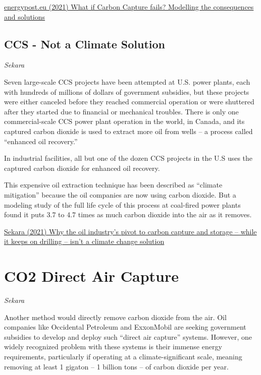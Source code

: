 \documentclass[
]{book}
\begin{document}
\href{https://energypost.eu/what-if-carbon-capture-fails-modelling-the-consequences-and-solutions/}{energypost.eu (2021) What if Carbon Capture fails? Modelling the consequences and solutions}

\hypertarget{ccs---not-a-climate-solution}{%
\section{CCS - Not a Climate Solution}\label{ccs---not-a-climate-solution}}

\emph{Sekara}

Seven large-scale CCS projects have been attempted at U.S. power plants, each with hundreds of millions of dollars of government subsidies, but these projects were either canceled before they reached commercial operation or were shuttered after they started due to financial or mechanical troubles. There is only one commercial-scale CCS power plant operation in the world, in Canada, and its captured carbon dioxide is used to extract more oil from wells -- a process called ``enhanced oil recovery.''

In industrial facilities, all but one of the dozen CCS projects in the U.S uses the captured carbon dioxide for enhanced oil recovery.

This expensive oil extraction technique has been described as ``climate mitigation'' because the oil companies are now using carbon dioxide. But a modeling study of the full life cycle of this process at coal-fired power plants found it puts 3.7 to 4.7 times as much carbon dioxide into the air as it removes.

\href{https://theconversation.com/why-the-oil-industrys-pivot-to-carbon-capture-and-storage-while-it-keeps-on-drilling-isnt-a-climate-change-solution-171791}{Sekara (2021) Why the oil industry's pivot to carbon capture and storage -- while it keeps on drilling -- isn't a climate change solution}

\hypertarget{co2-direct-air-capture}{%
\chapter{CO2 Direct Air Capture}\label{co2-direct-air-capture}}

\emph{Sekara}

Another method would directly remove carbon dioxide from the air. Oil companies like Occidental Petroleum and ExxonMobil are seeking government subsidies to develop and deploy such ``direct air capture'' systems. However, one widely recognized problem with these systems is their immense energy requirements, particularly if operating at a climate-significant scale, meaning removing at least 1 gigaton -- 1 billion tons -- of carbon dioxide per year.
\end{document}
